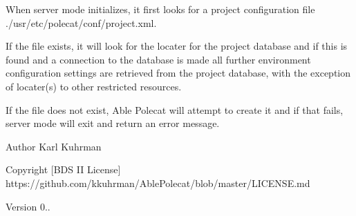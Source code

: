 \begin{DoxyEnumerate}
\item When server mode initializes, it first looks for a project configuration file ./usr/etc/polecat/conf/project.xml.
\item If the file exists, it will look for the locater for the project database and if this is found and a connection to the database is made all further environment configuration settings are retrieved from the project database, with the exception of locater(s) to other restricted resources.
\item If the file does not exist, Able Polecat will attempt to create it and if that fails, server mode will exit and return an error message.
\end{DoxyEnumerate}

\begin{DoxyAuthor}{Author}
Karl Kuhrman 
\end{DoxyAuthor}
\begin{DoxyCopyright}{Copyright}
\mbox{[}B\+D\+S I\+I License\mbox{]} https\+://github.com/kkuhrman/\+Able\+Polecat/blob/master/\+L\+I\+C\+E\+N\+S\+E.\+md 
\end{DoxyCopyright}
\begin{DoxyVersion}{Version}
0.. 
\end{DoxyVersion}
